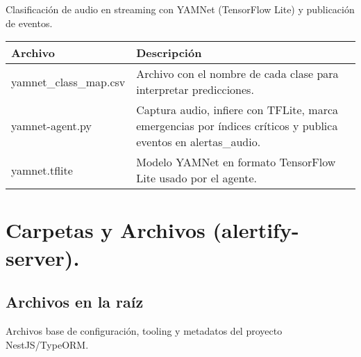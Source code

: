 Clasificación de audio en streaming con YAMNet (TensorFlow Lite) y publicación de eventos.

\begin{table}[H]
  \doublespacing
  \begin{tabularx}{\textwidth}{l X}
    \hline
    \textbf{Archivo}       & \textbf{Descripción} \\
    \hline
    yamnet\_class\_map.csv &
    Archivo con el nombre de cada clase para interpretar predicciones.
    \\
    yamnet-agent.py        &
    Captura audio, infiere con TFLite, marca emergencias por índices críticos y publica eventos en alertas\_audio.
    \\
    yamnet.tflite          &
    Modelo YAMNet en formato TensorFlow Lite usado por el agente.
    \\
    \hline
  \end{tabularx}
\end{table}

\section*{Carpetas y Archivos (alertify-server).}

\subsection*{Archivos en la raíz}

Archivos base de configuración, tooling y metadatos del proyecto NestJS/TypeORM.


